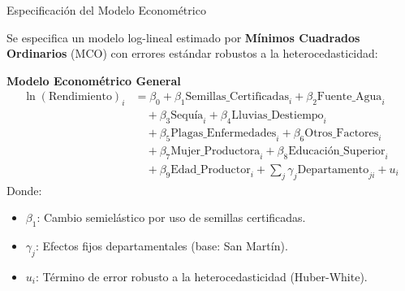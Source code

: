 \documentclass[t]{beamer}
\begin{document}
\begin{frame}{Especificación del Modelo Econométrico}
\hspace{0.2cm}
\begin{minipage}{0.92\textwidth}
\vspace{-0.55cm}
    \small
    \justifying
    Se especifica un modelo log-lineal estimado por \textbf{Mínimos Cuadrados Ordinarios} (MCO) con errores estándar robustos a la heterocedasticidad:
    \vspace{0.08cm}
    
    \textbf{Modelo Econométrico General}
    \vspace{-0.15cm}
    {\footnotesize
    \begin{align*}
    \ln(\text{Rendimiento})_i &= \beta_0 + \beta_1 \text{Semillas\_Certificadas}_i + \beta_2 \text{Fuente\_Agua}_i \\
    &\quad + \beta_3 \text{Sequía}_i + \beta_4 \text{Lluvias\_Destiempo}_i \\
    &\quad + \beta_5 \text{Plagas\_Enfermedades}_i + \beta_6 \text{Otros\_Factores}_i \\
    &\quad + \beta_7 \text{Mujer\_Productora}_i + \beta_8 \text{Educación\_Superior}_i \\
    &\quad + \beta_9 \text{Edad\_Productor}_i + \sum_{j} \gamma_j \text{Departamento}_{ji} + u_i
    \end{align*}
    }
    \vspace{-0.25cm}
    Donde:
        \begin{itemize}
            \setlength{\itemsep}{1pt}
            \footnotesize
            \item $\beta_1$: Cambio semielástico por uso de semillas certificadas.
            \item $\gamma_j$: Efectos fijos departamentales (base: San Martín).
            \item $u_i$: Término de error robusto a la heterocedasticidad (Huber-White).
        \end{itemize}

\end{minipage}
\end{frame}
\end{document}
